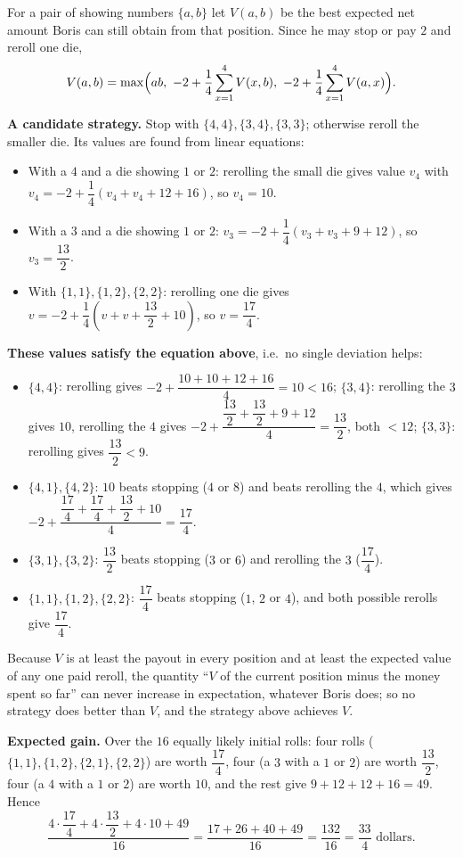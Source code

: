 For a pair of showing numbers $\{a,b\}$ let $V(a,b)$ be the best expected net amount Boris can still obtain from that position. Since he may stop or pay $2$ and reroll one die,
\[
V(a,b)=\max\Bigl(ab,\ -2+\dfrac{1}{4}\sum_{x=1}^{4}V(x,b),\ -2+\dfrac{1}{4}\sum_{x=1}^{4}V(a,x)\Bigr).
\]

\textbf{A candidate strategy.} Stop with $\{4,4\},\{3,4\},\{3,3\}$; otherwise reroll the smaller die. Its values are found from linear equations:
\begin{itemize}
\item With a $4$ and a die showing $1$ or $2$: rerolling the small die gives value $v_4$ with $v_4=-2+\dfrac{1}{4}(v_4+v_4+12+16)$, so $v_4=10$.
\item With a $3$ and a die showing $1$ or $2$: $v_3=-2+\dfrac{1}{4}(v_3+v_3+9+12)$, so $v_3=\dfrac{13}{2}$.
\item With $\{1,1\},\{1,2\},\{2,2\}$: rerolling one die gives $v=-2+\dfrac{1}{4}\left(v+v+\dfrac{13}{2}+10\right)$, so $v=\dfrac{17}{4}$.
\end{itemize}

\textbf{These values satisfy the equation above}, i.e.\ no single deviation helps:
\begin{itemize}
\item $\{4,4\}$: rerolling gives $-2+\dfrac{10+10+12+16}{4}=10<16$; $\{3,4\}$: rerolling the $3$ gives $10$, rerolling the $4$ gives $-2+\dfrac{\dfrac{13}{2}+\dfrac{13}{2}+9+12}{4}=\dfrac{13}{2}$, both $<12$; $\{3,3\}$: rerolling gives $\dfrac{13}{2}<9$.
\item $\{4,1\},\{4,2\}$: $10$ beats stopping ($4$ or $8$) and beats rerolling the $4$, which gives $-2+\dfrac{\dfrac{17}{4}+\dfrac{17}{4}+\dfrac{13}{2}+10}{4}=\dfrac{17}{4}$.
\item $\{3,1\},\{3,2\}$: $\dfrac{13}{2}$ beats stopping ($3$ or $6$) and rerolling the $3$ ($\dfrac{17}{4}$).
\item $\{1,1\},\{1,2\},\{2,2\}$: $\dfrac{17}{4}$ beats stopping ($1$, $2$ or $4$), and both possible rerolls give $\dfrac{17}{4}$.
\end{itemize}
Because $V$ is at least the payout in every position and at least the expected value of any one paid reroll, the quantity ``$V$ of the current position minus the money spent so far'' can never increase in expectation, whatever Boris does; so no strategy does better than $V$, and the strategy above achieves $V$.

\textbf{Expected gain.} Over the $16$ equally likely initial rolls: four rolls ($\{1,1\},\{1,2\},\{2,1\},\{2,2\}$) are worth $\dfrac{17}{4}$, four (a $3$ with a $1$ or $2$) are worth $\dfrac{13}{2}$, four (a $4$ with a $1$ or $2$) are worth $10$, and the rest give $9+12+12+16=49$. Hence
\[
\dfrac{4\cdot\dfrac{17}{4}+4\cdot\dfrac{13}{2}+4\cdot10+49}{16}=\dfrac{17+26+40+49}{16}=\dfrac{132}{16}=\boxed{\dfrac{33}{4}}\text{ dollars}.
\]
